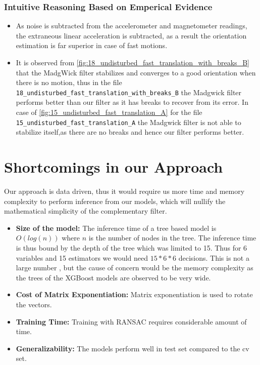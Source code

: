 \documentclass{iutbscthesis}
\begin{document}
\subsection{Intuitive Reasoning Based on Emperical Evidence}

\begin{itemize}
    \item As noise is subtracted from the accelerometer and magnetometer readings, the extraneous linear acceleration is subtracted, as a 
    result the orientation estimation is far superior in case of fast motions.
    \item It is observed from \autoref{fig:18_undisturbed_fast_translation_with_breaks_B} that the MadgWick filter stabilizes and converges to a good orientation when there is no motion, thus in the file \\ \texttt{18\_undisturbed\_fast\_translation\_with\_breaks\_B} the Madgwick filter performs better than our filter as it
    has breaks to recover from its error. In case of \autoref{fig:15_undisturbed_fast_translation_A} for the file 
    \texttt{15\_undisturbed\_fast\_translation\_A} the Madgwick filter is not able to stabilize itself,as there are no breaks and hence our filter performs better.
\end{itemize}

\chapter{Shortcomings in our Approach}
Our approach is data driven, thus it would require us more time and memory complexity to perform inference from our models, which will nullify the mathematical simplicity of the complementary filter.

\begin{itemize}
    \item \textbf{Size of the model:} The inference time of a tree based model is $O(log(n))$ where $n$ is the number of nodes in the tree. The inference time is thus bound by the depth of the tree which was limited to 15. Thus for 6 variables and 15 estimators we would need $15*6*6$ decisions. This is not a large number , but the cause of concern would be the memory complexity as the trees of the XGBoost models are observed to be very wide.
    \item \textbf{Cost of Matrix Exponentiation:} Matrix exponentiation is used to rotate the vectors.
    \item  \textbf{Training Time:} Training with RANSAC requires considerable amount of time.
    \item \textbf{Generalizability:} The models perform well in test set compared to the cv set.
\end{itemize}
\end{document}
